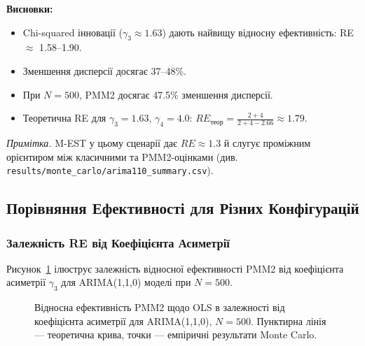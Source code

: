 \documentclass[12pt,a4paper]{article}
\begin{document}
\textbf{Висновки:}
\begin{itemize}
    \item Chi-squared інновації ($\gamma_3 \approx 1.63$) дають найвищу відносну ефективність: RE $\approx$ 1.58--1.90.
    \item Зменшення дисперсії досягає 37--48\%.
    \item При $N = 500$, PMM2 досягає 47.5\% зменшення дисперсії.
    \item Теоретична RE для $\gamma_3 = 1.63$, $\gamma_4 = 4.0$: $RE_{\text{теор}} = \frac{2+4}{2+4-2.66} \approx 1.79$.
\end{itemize}

\noindent\textit{Примітка.} M-EST у цьому сценарії дає $RE \approx 1.3$ й слугує проміжним орієнтиром між класичними та PMM2-оцінками (див. \texttt{results/monte\_carlo/arima110\_summary.csv}).

\subsection{Порівняння Ефективності для Різних Конфігурацій}
\label{subsec:efficiency_comparison}

\subsubsection{Залежність RE від Коефіцієнта Асиметрії}

Рисунок~\ref{fig:re_vs_skewness} ілюструє залежність відносної ефективності PMM2 від коефіцієнта асиметрії $\gamma_3$ для ARIMA(1,1,0) моделі при $N = 500$.

\begin{figure}[h]
\centering
{}
\caption{Відносна ефективність PMM2 щодо OLS в залежності від коефіцієнта асиметрії для ARIMA(1,1,0), $N=500$. Пунктирна лінія --- теоретична крива, точки --- емпіричні результати Monte Carlo.}
\label{fig:re_vs_skewness}
\end{figure}
\end{document}
